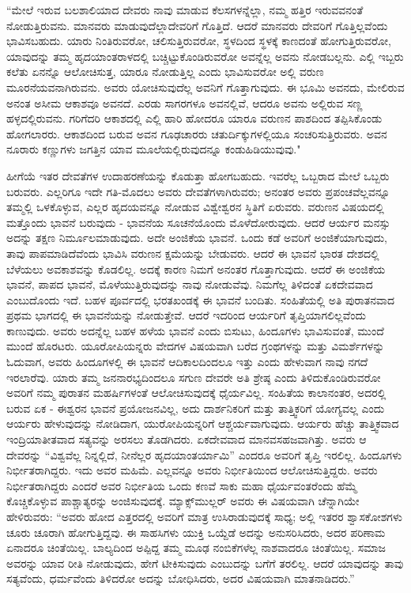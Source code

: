 “ಮೇಲೆ ಇರುವ ಬಲಶಾಲಿಯಾದ ದೇವರು ನಾವು ಮಾಡುವ ಕೆಲಸಗಳನ್ನೆಲ್ಲಾ, ನಮ್ಮ ಹತ್ತಿರ ಇರುವವನಂತೆ ನೋಡುತ್ತಿರುವನು. ಮಾನವರು ಮಾಡುವುದೆಲ್ಲಾ\break ದೇವರಿಗೆ ಗೊತ್ತಿದೆ. ಆದರೆ ಮಾನವರು ದೇವರಿಗೆ ಗೊತ್ತಿಲ್ಲವೆಂದು ಭಾವಿಸಬಹುದು. ಯಾರು ನಿಂತಿರುವರೋ, ಚಲಿಸುತ್ತಿರುವರೋ, ಸ್ಥಳದಿಂದ ಸ್ಥಳಕ್ಕೆ ಕಾಣದಂತೆ ಹೋಗುತ್ತಿರುವರೋ, ಯಾವುದನ್ನು ತಮ್ಮ ಹೃದಯಾಂತರಾಳದಲ್ಲಿ ಬಚ್ಚಿಟ್ಟುಕೊಂಡಿರುವರೋ ಅವನ್ನೆಲ್ಲ ಅವನು ನೋಡಬಲ್ಲನು. ಎಲ್ಲಿ ಇಬ್ಬರು ಕಲೆತು ಏನನ್ನೊ ಆಲೋಚಿಸುತ್ತ, ಯಾರೂ ನೋಡುತ್ತಿಲ್ಲ ಎಂದು ಭಾವಿಸುವರೋ ಅಲ್ಲಿ ವರುಣ ಮೂರನೆಯವನಾಗಿರುವನು. ಅವರು ಯೋಚಿಸುವುದೆಲ್ಲ ಅವನಿಗೆ ಗೊತ್ತಾಗುವುದು. ಈ ಭೂಮಿ ಅವನದು, ಮೇಲಿರುವ ಅನಂತ ಅಸೀಮ ಆಕಾಶವೂ ಅವನದೆ. ಎರಡು ಸಾಗರಗಳೂ ಅವನಲ್ಲಿವೆ, ಆದರೂ ಅವನು ಅಲ್ಲಿರುವ ಸಣ್ಣ ಹಳ್ಳದಲ್ಲಿರುವನು. ಗರಿಗೆದರಿ ಆಕಾಶದಲ್ಲಿ ಎಲ್ಲಿ ಹಾರಿ ಹೋದರೂ ಯಾರೂ ವರುಣನ ಪಾಶದಿಂದ ತಪ್ಪಿಸಿಕೊಂಡು ಹೋಗಲಾರರು. ಆಕಾಶದಿಂದ ಬರುವ ಅವನ ಗೂಢಚಾರರು ಚತುರ್ದಿಕ್ಕುಗಳಲ್ಲಿಯೂ ಸಂಚರಿಸುತ್ತಿರುವರು. ಅವನ ನೂರಾರು ಕಣ್ಣುಗಳು ಜಗತ್ತಿನ ಯಾವ ಮೂಲೆಯಲ್ಲಿರುವುದನ್ನೂ ಕಂಡುಹಿಡಿಯುವುವು."

ಹೀಗೆಯೆ ಇತರ ದೇವತೆಗಳ ಉದಾಹರಣೆಯನ್ನು ಕೊಡುತ್ತಾ ಹೋಗಬಹುದು. ಇವರೆಲ್ಲ ಒಬ್ಬರಾದ ಮೇಲೆ ಒಬ್ಬರು ಬರುವರು. ಎಲ್ಲರಿಗೂ ಇದೇ ಗತಿ-ಮೊದಲು ಅವರು ದೇವತೆಗಳಾಗಿರುವರು; ಅನಂತರ ಅವರು ಪ್ರಪಂಚವೆಲ್ಲವನ್ನೂ ತಮ್ಮಲ್ಲಿ ಒಳಕೊಳ್ಳುವ, ಎಲ್ಲರ ಹೃದಯವನ್ನೂ ನೋಡುವ ವಿಶ್ವೇಶ್ವರನ ಸ್ಥಿತಿಗೆ ಏರುವರು. ವರುಣನ ವಿಷಯದಲ್ಲಿ ಮತ್ತೊಂದು ಭಾವನೆ ಬರುವುದು - ಭಾವನೆಯ ಸೂಚನೆಯೊಂದು ಮೊಳೆದೋರುವುದು. ಆದರೆ ಆರ್ಯರ ಮನಸ್ಸು ಅದನ್ನು ತಕ್ಷಣ ನಿರ್ಮೂಲ\break ಮಾಡುವುದು. ಅದೇ ಅಂಜಿಕೆಯ ಭಾವನೆ. ಒಂದು ಕಡೆ ಅವರಿಗೆ ಅಂಜಿಕೆಯಾಗುವುದು, ತಾವು ಪಾಪಮಾಡಿದೆವೆಂದು ಭಾವಿಸಿ ವರುಣನ ಕ್ಷಮೆಯನ್ನು ಬೇಡುವರು. ಆದರೆ ಈ ಭಾವನೆ ಭಾರತ ದೇಶದಲ್ಲಿ ಬೆಳೆಯಲು ಅವಕಾಶವನ್ನು ಕೊಡಲಿಲ್ಲ. ಅದಕ್ಕೆ ಕಾರಣ ನಿಮಗೆ ಅನಂತರ ಗೊತ್ತಾಗುವುದು. ಆದರೆ ಈ ಅಂಜಿಕೆಯ ಭಾವನೆ, ಪಾಪದ ಭಾವನೆ, ಮೊಳೆಯುತ್ತಿರುವುದನ್ನು ನಾವು ನೋಡುವೆವು. ನಿಮಗೆಲ್ಲ ತಿಳಿದಂತೆ ಏಕದೇವವಾದ ಎಂಬುದೊಂದು ಇದೆ. ಬಹಳ ಪೂರ್ವದಲ್ಲಿ ಭರತಖಂಡಕ್ಕೆ ಈ ಭಾವನೆ ಬಂದಿತು. ಸಂಹಿತೆಯಲ್ಲಿ ಅತಿ ಪುರಾತನವಾದ ಪ್ರಥಮ ಭಾಗದಲ್ಲಿ ಈ ಭಾವನೆಯನ್ನು ನೋಡುತ್ತೇವೆ. ಆದರೆ ಇದರಿಂದ ಆರ್ಯರಿಗೆ ತೃಪ್ತಿಯಾಗಲಿಲ್ಲವೆಂದು ಕಾಣುವುದು. ಅವರು ಅದನ್ನೆಲ್ಲ ಬಹಳ ಹಳೆಯ ಭಾವನೆ ಎಂದು ಬಿಸುಟು, ಹಿಂದೂಗಳು ಭಾವಿಸುವಂತೆ, ಮುಂದೆ ಮುಂದೆ ಹೊರಟರು. ಯೂರೋಪಿಯನ್ನರು ವೇದಗಳ ವಿಷಯವಾಗಿ ಬರೆದ ಗ್ರಂಥಗಳನ್ನು ಮತ್ತು ವಿಮರ್ಶೆಗಳನ್ನು ಓದುವಾಗ, ಅವರು ಹಿಂದೂಗಳಲ್ಲಿ ಈ ಭಾವನೆ ಆದಿಕಾಲದಿಂದಲೂ ಇತ್ತು ಎಂದು ಹೇಳುವಾಗ ನಾವು ನಗದೆ ಇರಲಾರೆವು. ಯಾರು ತಮ್ಮ ಜನನಾರಭ್ಯದಿಂದಲೂ ಸಗುಣ ದೇವರೇ ಅತಿ ಶ್ರೇಷ್ಠ ಎಂದು ತಿಳಿದುಕೊಂಡಿರುವರೋ ಅವರಿಗೆ ನಮ್ಮ ಪುರಾತನ ಮಹರ್ಷಿಗಳಂತೆ ಆಲೋಚಿಸುವುದಕ್ಕೆ ಧೈರ್ಯವಿಲ್ಲ. ಸಂಹಿತೆಯ ಕಾಲಾನಂತರ, ಅದರಲ್ಲಿ ಬರುವ ಏಕ - ಈಶ್ವರನ ಭಾವನೆ ಪ್ರಯೋಜನವಿಲ್ಲ, ಅದು ದಾರ್ಶನಿಕರಿಗೆ ಮತ್ತು ತಾತ್ತ್ವಿಕರಿಗೆ ಯೋಗ್ಯವಲ್ಲ ಎಂದು ಆರ್ಯರು ಹೇಳುವುದನ್ನು ನೋಡಿದಾಗ, ಯುರೋಪಿಯನ್ನರಿಗೆ ಆಶ್ಚರ್ಯವಾಗುವುದು. ಆರ್ಯರು ಹೆಚ್ಚು ತಾತ್ತ್ವಿಕವಾದ ಇಂದ್ರಿಯಾತೀತವಾದ ಸತ್ಯವನ್ನು ಅರಸಲು ತೊಡಗಿದರು. ಏಕದೇವವಾದ ಮಾನವಸಹಜವಾಗಿತ್ತು. ಅವರು ಆ ದೇವರನ್ನು “ವಿಶ್ವವೆಲ್ಲ ನಿನ್ನಲ್ಲಿದೆ, ನೀನೆಲ್ಲರ ಹೃದಯಾಂತರ್ಯಾಮಿ” ಎಂದರೂ ಅವರಿಗೆ ತೃಪ್ತಿ ಇರಲಿಲ್ಲ. ಹಿಂದೂಗಳು ನಿರ್ಭೀತರಾಗಿದ್ದರು. ಇದು ಅವರ ಮಹಿಮೆ. ಎಲ್ಲವನ್ನೂ ಅವರು ನಿರ್ಭೀತಿಯಿಂದ ಆಲೋಚಿಸುತ್ತಿದ್ದರು. ಅವರು ನಿರ್ಭೀತರಾಗಿದ್ದರು ಎಂದರೆ ಅವರ ನಿರ್ಭೀತಿಯ ಒಂದು ಕಣವೆ ಸಾಕು ಮಹಾ ಧೈರ್ಯವಂತರೆಂದು ಹೆಮ್ಮೆ ಕೊಚ್ಚಿಕೊಳ್ಳುವ ಪಾಶ್ಚಾತ್ಯರನ್ನು ಅಂಜಿಸುವುದಕ್ಕೆ. ಮ್ಯಾಕ್ಸ್‌ಮುಲ್ಲರ್ ಅವರು ಈ ವಿಷಯವಾಗಿ ಚೆನ್ನಾಗಿಯೇ ಹೇಳಿರುವರು: “ಅವರು ಹೋದ ಎತ್ತರದಲ್ಲಿ ಅವರಿಗೆ ಮಾತ್ರ ಉಸಿರಾಡುವುದಕ್ಕೆ ಸಾಧ್ಯ; ಅಲ್ಲಿ ಇತರರ ಶ್ವಾಸಕೋಶಗಳು ಚೂರು ಚೂರಾಗಿ ಹೋಗುತ್ತಿದ್ದವು. ಈ ಸಾಹಸಿಗಳು ಯುಕ್ತಿ ಒಯ್ದೆಡೆ ಅದನ್ನು ಅನುಸರಿಸಿದರು, ಅದರ ಪರಿಣಾಮ ಏನಾದರೂ ಚಿಂತೆಯಿಲ್ಲ. ಬಾಲ್ಯದಿಂದ ಅಪ್ಪಿದ್ದ ತಮ್ಮ ಮೂಢ ನಂಬಿಕೆಗಳೆಲ್ಲ ನಾಶವಾದರೂ ಚಿಂತೆಯಿಲ್ಲ. ಸಮಾಜ ಅವರನ್ನು ಯಾವ ರೀತಿ ನೋಡುವುದು, ಹೇಗೆ ಟೀಕಿಸುವುದು ಎಂಬುದನ್ನು ಬಗೆಗೆ ತರಲಿಲ್ಲ. ಆದರೆ ಯಾವುದನ್ನು ತಾವು ಸತ್ಯವೆಂದು, ಧರ್ಮವೆಂದು ತಿಳಿದರೋ ಅದನ್ನು ಬೋಧಿಸಿದರು, ಅದರ ವಿಷಯವಾಗಿ ಮಾತನಾಡಿದರು.”

